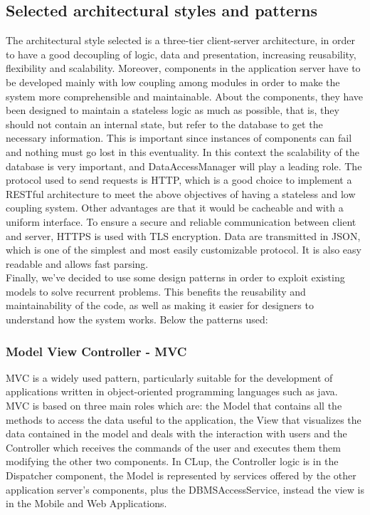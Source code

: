 \subsection{Selected architectural styles and patterns}
The architectural style selected is a three-tier client-server architecture, in order to have a good decoupling of logic, data and presentation, increasing reusability, flexibility and scalability. Moreover, components in the application server have to be developed mainly with low coupling among modules in order to make the system more comprehensible and maintainable. About the components, they have been designed to maintain a stateless logic as much as possible, that is, they should not contain an internal state, but refer to the database to get the necessary information. This is important since instances of components can fail and nothing must go lost in this eventuality. In this context the scalability of the database is very important, and DataAccessManager will play a leading role. 
The protocol used to send requests is HTTP, which is a good choice to implement a RESTful architecture to meet the above objectives of having a stateless and low coupling system. Other advantages are that it would be cacheable and with a uniform interface.
To ensure a secure and reliable communication between client and server, HTTPS is used with TLS encryption.
Data are transmitted in JSON, which is one of the simplest and most easily customizable protocol. It is also easy readable and allows fast parsing.\\
Finally, we've decided to use some design patterns in order to exploit existing models to solve recurrent problems. This benefits the reusability and maintainability of the code, as well as making it easier for designers to understand how the system works. Below the patterns used: \\
\subsubsection{Model View Controller - MVC}
MVC is a widely used pattern, particularly suitable for the development of applications written in object-oriented programming languages such as java. MVC is based on three main roles which are: the Model that contains all the methods to access the data useful to the application, the View that visualizes the data contained in the model and deals with the interaction with users and the Controller which receives the commands of the user and executes them them modifying the other two components. In CLup, the Controller logic is in the Dispatcher component, the Model is represented by services offered by the other application server's components, plus the DBMSAccessService, instead the view is in the Mobile and Web Applications.\\
